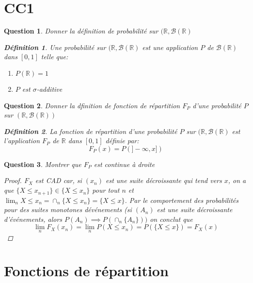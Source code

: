 \documentclass{article}
\theoremstyle{plain}
\newtheorem{question}{Question}
\theoremstyle{definition}
\newtheorem{definition}{Définition}
\begin{document}
\section{CC1}
\begin{question}
	Donner la définition de probabilité sur $(\mathbb{R}, \mathscr{B} (\mathbb{R})$
	\begin{definition}
		Une probabilité sur $(\mathbb{R}, \mathscr{B} (\mathbb{R})$ est une application $P$ de $\mathscr{B} (\mathbb{R})$ dans $[0,1]$ telle que:
		\begin{enumerate}
			\item $P(\mathbb{R}) = 1$
			\item $P$ est $\sigma$-additive
		\end{enumerate}
	\end{definition}
\end{question}

\begin{question}
	Donner la dfinition de fonction de répartition $F_P$ d'une probabilité $P$ sur $(\mathbb{R}, \mathscr{B} (\mathbb{R}))$

	\begin{definition}
		La fonction de répartition d'une probabilité $P$ sur $(\mathbb{R}, \mathscr{B} (\mathbb{R})$ est l'application $F_P$ de $\mathbb{R}$ dans $[0,1]$ définie par:
		\begin{equation*}
			F_P(x) = P(]-\infty, x])
		\end{equation*}
	\end{definition}
\end{question}

\begin{question}
	Montrer que $F_P$ est continue à droite
	\begin{proof}
		$F_X$ est CAD car, si $(x_n)$ est une suite décroissante qui tend vers $x$, on a que $\{X \leq
			x_{n+1}\} \in \{X \leq x_n\}$ pour tout $n$ et $\lim_n{X \leq x_n} = \cap_n{\{X \leq x_n\}} = \{{X \leq x\}}$.
		Par le comportement des probabilités pour des suites monotones dévénements
		(si $(A_n)$ est une suite décroissante d’événements, alors $P (A_n) \implies P (\cap_n{\{A_n\}}))$
		on conclut que
		\begin{equation*}
			\lim_n F_X (x_n) = \lim_n{ P (X \leq x_n)} = P (\{X \leq x\}) = F_X (x)
		\end{equation*}
	\end{proof}
\end{question}

\section{Fonctions de répartition}
\end{document}
